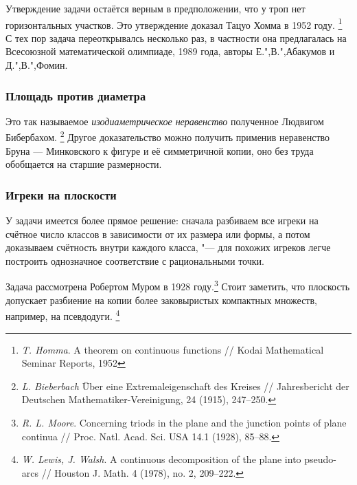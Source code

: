\documentclass[twoside]{book}
\begin{document}
Утверждение задачи остаётся верным в предположении, что у троп нет горизонтальных участков.
Это утверждение доказал Тацуо Хомма в 1952 году.%
\footnote{\emph{T. Homma}. A theorem on continuous functions /\!/ Kodai Mathematical Seminar Reports, 1952}
С тех пор задача переоткрывалсь несколько раз, в частности она предлагалась на Всесоюзной математической олимпиаде, 1989 года, авторы Е.",В.",Абакумов и Д.",В.",Фомин.

\subsubsection{Площадь против диаметра}
Это так называемое \emph{изодиаметрическое неравенство} полученное Людвигом Бибербахом.%
\footnote{\emph{L. Bieberbach} Über eine Extremaleigenschaft des Kreises /\!/ {Jahresbericht der Deutschen Mathematiker-Vereinigung}, 24 (1915), 247--250.}
Другое доказательство можно получить применив неравенство Бруна — Минковского к фигуре и её симметричной
копии, оно без труда обобщается на старшие размерности.

\subsubsection{Игреки на плоскости}
У задачи имеется более прямое решение: сначала разбиваем все игреки на счётное число классов в зависимости от их размера или формы, 
а потом доказываем счётность внутри каждого класса, "--- для похожих игреков легче построить однозначное соответствие с рациональными точки.

Задача рассмотрена Робертом Муром в 1928 году.\footnote{\emph{R. L. Moore}. Concerning triods in the plane and the junction points of plane continua /\!/ {Proc. Natl. Acad. Sci. USA} 14.1 (1928), 85--88.}
Стоит заметить, что плоскость допускает разбиение на копии более заковыристых компактных множеств, например, на псевдодуги.%
\footnote{\emph{W. Lewis, J. Walsh}. 
A continuous decomposition of the plane into pseudo-arcs /\!/
Houston J. Math. 4 (1978), no. 2, 209--222.} 

{
\small

\printindex

}

{

\sloppy

\printbibliography[title={Дополнительная литература},heading=bibintoc]


\fussy

}

\newpage

{

\tableofcontents

}
\end{document}
